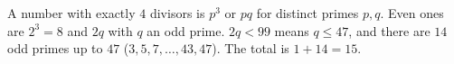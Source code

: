 A number with exactly $4$ divisors is $p^3$ or $pq$ for distinct primes $p,q$. Even ones are $2^3=8$ and $2q$ with $q$ an odd prime. $2q<99$ means $q\le47$, and there are $14$ odd primes up to $47$ ($3,5,7,\dots,43,47$). The total is $1+14=\boxed{15}$.
